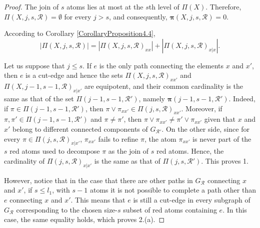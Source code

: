 \documentclass[10pt,a4paper]{amsart}
\begin{document}
	\begin{proof}
		The join of $s$ atoms lies at most at the $s$th level of $\Pi(X)$. Therefore, $\Pi(X,j,s,\mathcal{R})=\emptyset$ for every $j>s$, and consequently, $\bm{\pi}(X, j,s,\mathcal{R})=0$.
		
		According to Corollary \ref{CorollaryProposition4.4},   	\begin{equation}
		|\Pi(X, j, s,\mathcal{R})| = |\Pi(X, j, s,\mathcal{R})_{xx}|+|\Pi(X,j, s,\mathcal{R})_{x|x}|.
		\end{equation}
		
		 Let us suppose that $j\leq s$. If $e$ is the only path connecting the elements $x$ and $x'$, then $e$ is a cut-edge and hence the sets $\Pi(X,j,s,\mathcal{R})_{xx'}$ and $\Pi(X,j-1,s-1,\mathcal{R})_{x|x'}$ are equipotent, and their common cardinality is the same as that of the set $\Pi(j-1,s-1,\mathcal{R}')$, namely $\bm{\pi}(j-1,s-1,\mathcal{R}')$. Indeed, if $\pi\in\Pi(j-1,s-1,\mathcal{R}')$, then $\pi\vee\pi_{xx'}\in \Pi(j,s,\mathcal{R})_{xx'}$. Moreover, if $\pi,\pi'\in\Pi(j-1,s-1,\mathcal{R}')$ and $\pi\neq\pi'$, then $\pi\vee\pi_{xx'}\neq\pi'\vee\pi_{xx'}$ given that $x$ and $x'$ belong to different connected components of $G_{\mathcal{R}'}$. On the other side, since for every $\pi\in\Pi(j,s,\mathcal{R})_{x|x'}$, $\pi_{xx'}$ fails to refine $\pi$, the atom $\pi_{xx'}$ is never part of the $s$ red atoms used to decompose $\pi$ as the join of $s$ red atoms. Hence, the cardinality of $\Pi(j,s,\mathcal{R})_{x|x'}$ is the same as that of $\Pi(j,s,\mathcal{R}')$. This proves 1.
		
		However, notice that in the case that there are other paths in $G_{\mathcal{R}}$ connecting $x$ and $x'$, if $s\leq l_1$,  with $s-1$ atoms it is not possible to complete a path other than $e$ connecting $x$ and $x'$. This means that $e$ is still a cut-edge in every subgraph of $G_{\mathcal{R}}$ corresponding to the chosen size-$s$ subset of red atoms containing $e$. In this case, the same equality holds, which proves 2.(a).
		

\end{proof}
\end{document}

